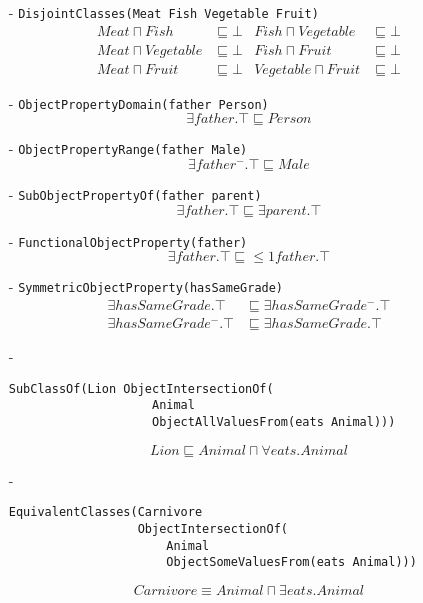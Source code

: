\documentclass[a4paper,12pt]{article}
\begin{document}
\begin{itemize}
\item[-]\verb|DisjointClasses(Meat Fish Vegetable Fruit)|
\begin{align*}
 Meat      \sqcap Fish      &\sqsubseteq \bot
&Fish      \sqcap Vegetable &\sqsubseteq \bot \\
 Meat      \sqcap Vegetable &\sqsubseteq \bot
&Fish      \sqcap Fruit     &\sqsubseteq \bot \\
 Meat      \sqcap Fruit     &\sqsubseteq \bot
&Vegetable \sqcap Fruit     &\sqsubseteq \bot
\end{align*}

\item[-]\verb|ObjectPropertyDomain(father Person)|
\begin{equation*}
\exists father.\top \sqsubseteq Person
\end{equation*}

\item[-]\verb|ObjectPropertyRange(father Male)|
\begin{equation*}
\exists father^-.\top \sqsubseteq Male
\end{equation*}

\item[-]\verb|SubObjectPropertyOf(father parent)|
\begin{equation*}
\exists father.\top \sqsubseteq \exists parent.\top
\end{equation*}

\item[-]\verb|FunctionalObjectProperty(father)|
\begin{equation*}
\exists father.\top \sqsubseteq {}\leq 1father.\top
\end{equation*}

\item[-]\verb|SymmetricObjectProperty(hasSameGrade)|
\begin{align*}
\exists hasSameGrade.\top   &\sqsubseteq \exists hasSameGrade^-.\top\\
\exists hasSameGrade^-.\top &\sqsubseteq \exists hasSameGrade.\top
\end{align*}

\item[-]\begin{Verbatim}[samepage=true]
SubClassOf(Lion ObjectIntersectionOf(
                    Animal
                    ObjectAllValuesFrom(eats Animal)))
\end{Verbatim}
\begin{equation*}
Lion \sqsubseteq Animal \sqcap \forall eats.Animal
\end{equation*}

\item[-]\begin{Verbatim}[samepage=true]
EquivalentClasses(Carnivore
                  ObjectIntersectionOf(
                      Animal
                      ObjectSomeValuesFrom(eats Animal)))
\end{Verbatim}
\begin{equation*}
Carnivore \equiv Animal \sqcap \exists eats.Animal
\end{equation*}
\end{itemize}
\end{document}
